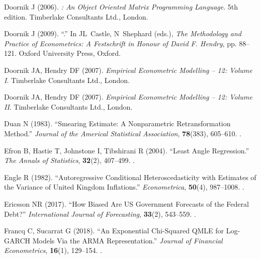 \documentclass[article,nojss]{jss}
\begin{document}
\begin{thebibliography}{56}
	Doornik J (2006).
	\newblock \emph{: An Object Oriented Matrix Programming Language}.
	\newblock 5th edition. Timberlake Consultants Ltd., London.
	
	Doornik J (2009).
	\newblock \enquote{.}
	\newblock In JL~Castle, N~Shephard (eds.), \emph{The Methodology and Practice
		of Econometrics: A Festschrift in Honour of David F. {H}endry}, pp. 88--121.
	Oxford University Press, Oxford.
	
	Doornik JA, Hendry DF (2007{}).
	\newblock \emph{Empirical Econometric Modelling --  12: Volume I}.
	\newblock Timberlake Consultants Ltd., London.
	
	Doornik JA, Hendry DF (2007{}).
	\newblock \emph{Empirical Econometric Modelling --  12: Volume II}.
	\newblock Timberlake Consultants Ltd., London.
	
	Duan N (1983).
	\newblock \enquote{Smearing Estimate: A Nonparametric Retransformation Method.}
	\newblock \emph{Journal of the Americal Statistical Association},
	\textbf{78}(383), 605--610.
	\newblock {}.
	
	Efron B, Hastie T, Johnstone I, Tibshirani R (2004).
	\newblock \enquote{Least Angle Regression.}
	\newblock \emph{The Annals of Statistics}, \textbf{32}(2), 407--499.
	\newblock {}.
	
	Engle R (1982).
	\newblock \enquote{Autoregressive Conditional Heteroscedasticity with Estimates
		of the Variance of United Kingdom Inflations.}
	\newblock \emph{Econometrica}, \textbf{50}(4), 987--1008.
	\newblock {}.
	
	Ericsson NR (2017).
	\newblock \enquote{How Biased Are US Government Forecasts of the Federal Debt?}
	\newblock \emph{International Journal of Forecasting}, \textbf{33}(2),
	543--559.
	\newblock {}.
	
	Francq C, Sucarrat G (2018).
	\newblock \enquote{An Exponential Chi-Squared QMLE for Log-GARCH Models Via the
		ARMA Representation.}
	\newblock \emph{Journal of Financial Econometrics}, \textbf{16}(1), 129--154.
	\newblock {}.
	

\end{thebibliography}
\end{document}
